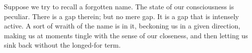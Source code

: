 \begin{savequote}[75mm]
Suppose we try to recall a forgotten name. The state of our consciousness is peculiar. There is a gap therein; but no mere gap. It is a gap that is intensely active. A sort of wraith of the name is in it, beckoning us in a given direction, making us at moments tingle with the sense of our closeness, and then letting us sink back without the longed-for term.
\end{savequote}





\label{sec:memory}


